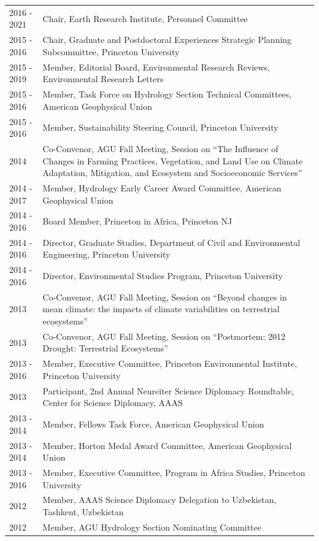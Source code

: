 \begin{longtable}{l p{5.5in}}
2016 - 2021 & Chair, Earth Research Institute, Personnel Committee \\
2015 - 2016 & Chair, Graduate and Postdoctoral Experiences Strategic Planning Subcommittee, Princeton University \\
2015 - 2019 & Member, Editorial Board, Environmental Research Reviews, Environmental Research Letters \\
2015 - 2016 & Member, Task Force on Hydrology Section Technical Committees, American Geophysical Union \\
2015 - 2016 & Member, Sustainability Steering Council, Princeton University \\
2014 & Co-Convenor, AGU Fall Meeting, Session on ``The Influence of Changes in Farming Practices, Vegetation, and Land Use on Climate Adaptation, Mitigation, and Ecosystem and Socioeconomic Services'' \\
2014 - 2017 & Member, Hydrology Early Career Award Committee, American Geophysical Union \\
2014 - 2016 & Board Member, Princeton in Africa, Princeton NJ \\
2014 - 2016 & Director, Graduate Studies, Department of Civil and Environmental Engineering, Princeton University \\
2014 - 2016 & Director, Environmental Studies Program, Princeton University \\
2013 & Co-Convenor, AGU Fall Meeting, Session on ``Beyond changes in mean climate: the impacts of climate variabilities on terrestrial ecosystems'' \\
2013 & Co-Convenor, AGU Fall Meeting, Session on ``Postmortem: 2012 Drought: Terrestrial Ecosystems'' \\
2013 - 2016 & Member, Executive Committee, Princeton Environmental Institute, Princeton University \\
2013 & Participant, 2nd Annual Neureiter Science Diplomacy Roundtable, Center for Science Diplomacy, AAAS \\
2013 - 2014 & Member, Fellows Task Force, American Geophysical Union \\
2013 - 2014 & Member, Horton Medal Award Committee, American Geophysical Union \\
2013 - 2016 & Member, Executive Committee, Program in Africa Studies, Princeton University \\
2012 & Member, AAAS Science Diplomacy Delegation to Uzbekistan, Tashkent, Uzbekistan \\
2012 & Member, AGU Hydrology Section Nominating Committee \\

\end{longtable}
